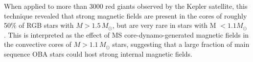 When applied to more than 3000 red giants observed by the Kepler satellite, this technique revealed that strong magnetic fields are present in the cores of roughly 50\% of RGB stars with $M \! > \! 1.5 \, M_\odot$, but are very rare in stars with M $< 1.1M_\odot$ \citep{Stello_2016,Stello_2016a}. This is interpreted as the effect of MS core-dynamo-generated magnetic fields in the convective cores of $M \! > \! 1.1 \, M_\odot$ stars, suggesting that a large fraction of main sequence OBA stars could host strong internal magnetic fields.



